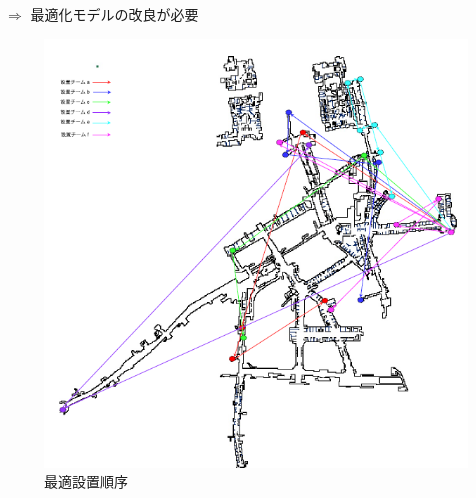 \documentclass[12pt,dvipdfmx]{beamer}
\begin{document}
{\begin{minipage}{0.6\columnwidth}
\begin{beamerboxesrounded}
        $\Rightarrow$ 最適化モデルの改良が必要
      \end{beamerboxesrounded}
      \end{minipage}
      \begin{minipage}{0.3\columnwidth}
        \centering
        \begin{figure}[H]
          \footnotesize
          \includegraphics[scale=0.38]{umedamap2.pdf}
          \caption{最適設置順序}
        \end{figure}
      \end{minipage}
      
        

    }
\frame
\end{document}
